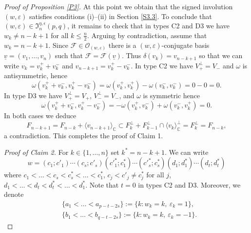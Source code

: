 \documentclass{amsart}
\theoremstyle{definition}
\begin{document}
\begin{proof}[Proof of Proposition \ref{P3}]
At this point we obtain that the signed involution $(w,\varepsilon)$ satisfies conditions {\rm (i)}--{\rm (ii)} in Section \ref{S3.3}.
To conclude that $(w,\varepsilon)\in\mathfrak{I}_n^{\eta,\epsilon}(p,q)$, it remains to check that in types C2 and D3 we have $w_k\not=n-k+1$ for all $k\leq\frac{n}{2}$. Arguing by contradiction, assume that $w_k=n-k+1$. Since $\mathcal{F}\in\mathcal{O}_{(w,\varepsilon)}$ there is a $(w,\varepsilon)$-conjugate basis $\underline{v}=(v_1,\ldots,v_n)$ such that $\mathcal{F}=\mathcal{F}(\underline{v})$.
Thus $\delta(v_k)=v_{n-k+1}$ so that we can write $v_k=v_k^++v_k^-$ and $v_{n-k+1}=v_k^+-v_k^-$.
In type C2 we have $V_+^\perp=V_-$ and $\omega$ is antisymmetric, hence
\[\omega(v_k^++v_k^-,v_k^+-v_k^-)=\omega(v_k^+,v_k^+)-\omega(v_k^-,v_k^-)=0-0=0.\]
In type D3 we have $V_+^\perp=V_+$, $V_-^\perp=V_-$, and $\omega$ is symmetric hence
\[\omega(v_k^++v_k^-,v_k^+-v_k^-)=-\omega(v_k^+,v_k^-)+\omega(v_k^-,v_k^+)=0.\]
In both cases we deduce
\[F_{n-k+1}=F_{n-k}+\langle v_{n-k+1}\rangle_{\mathbb{C}}\subset F_k^\perp+F_{k-1}^\perp\cap\langle v_k\rangle_\mathbb{C}^\perp=F_k^\perp=F_{n-k},\]
a contradiction.
This completes the proof of Claim 1. 

\medskip
\noindent
{\it Proof of Claim 2.}
For $k\in\{1,\ldots,n\}$ set $k^*=n-k+1$. We can write
\[w=(c_1;c'_1)\cdots(c_s;c'_s)(c'^*_1;c^*_1)\cdots(c'^*_s;c^*_s)(d_1;d^*_1)\cdots(d_t;d^*_t)\]
where $c_1<\ldots<c_s<c^*_s<\ldots<c^*_1$, $c_j<c'_j\not=c^*_j$ for all $j$, $d_1<\ldots<d_t<d^*_t<\ldots<d^*_1$. Note that $t=0$ in types C2 and D3.
Moreover, we denote
\begin{eqnarray*}
 & \{a_1<\ldots<a_{p-t-2s}\}:=\{k:w_k=k,\ \varepsilon_k=1\},\\
 & \{b_1<\ldots<b_{q-t-2s}\}:=\{k:w_k=k,\ \varepsilon_k=-1\}.
\end{eqnarray*}


\end{proof}
\end{document}
